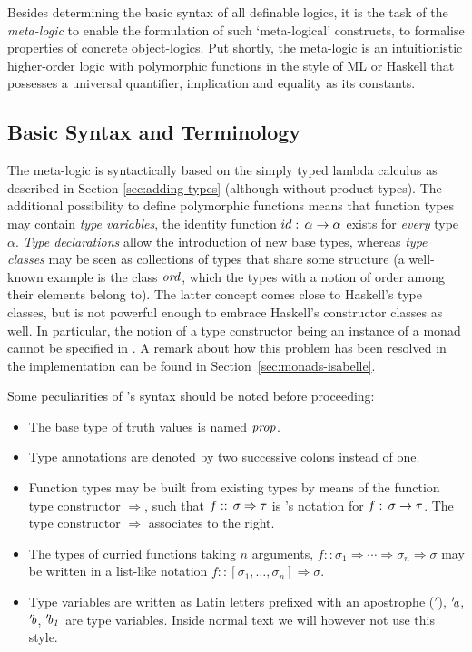 Besides determining the basic syntax of all definable logics, it is the task of
the \emph{meta-logic} to enable the formulation of such `meta-logical'
constructs, \IE to formalise properties of concrete object-logics. Put shortly,
the meta-logic is an intuitionistic higher-order logic with polymorphic
functions in the style of ML or Haskell that possesses a universal quantifier,
implication and equality as its constants.


\subsection{Basic Syntax and Terminology}
\label{sec:meta-basic-syntax}

The meta-logic is syntactically based on the simply typed lambda calculus as
described in Section \ref{sec:adding-types} (although without product types).
The additional possibility to define polymorphic functions means that function
types may contain \emph{type variables}, \EG the identity function ${id}
:\, \alpha \to \alpha$ exists for \emph{every} type $\alpha$.  \emph{Type declarations} allow
the introduction of new base types, whereas \emph{type classes} may be seen as
collections of types that share some structure (a well-known example is the
class $\mathit{ord}$, which the types with a notion of order among their elements
belong to). The latter concept comes close to Haskell's type classes, but is not
powerful enough to embrace Haskell's constructor classes as well. In particular,
the notion of a type constructor being an instance of a monad cannot be
specified in \Isabelle. A remark about how this problem has been resolved in the
implementation can be found in Section~\ref{sec:monads-isabelle}.

Some peculiarities of \Isabelle's syntax should be noted before proceeding: 
\begin{itemize}
\item The base type of truth values is named $\mathit{prop}$.
\item Type annotations are denoted by two successive colons instead of one.
\item Function types may be built from existing types by means of the function
  type constructor $\Rightarrow$, such that $f ::\, \sigma \Rightarrow \tau$ is \Isabelle's notation for
  $f:\, \sigma \to \tau$. The type constructor $\Rightarrow$ associates to the right.
\item The types of curried functions taking $n$ arguments, $f :: \sigma_1 \Rightarrow \cdots \Rightarrow \sigma_n \Rightarrow
  \sigma$ may be written in a list-like notation $f :: [\sigma_1,\ldots,\sigma_n] \Rightarrow \sigma$.
\item Type variables are written as Latin letters prefixed with an apostrophe
  ($'$), \EG ${'\!\mathit{a}}$, ${'\!\mathit{b}}$, ${'\!\mathit{b_1}}$ are type variables. Inside
  normal text we will however not use this style.
\end{itemize}

